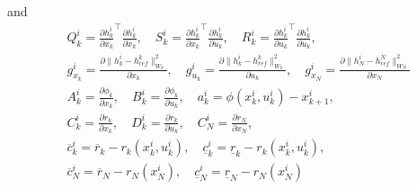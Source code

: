 \documentclass{article}
\newcommand{\norm}[1]{\lVert#1\rVert}
\begin{document}
and
\begin{equation}\label{QP data}
\begin{aligned}
&Q_k^i = \frac{\partial h_k^i}{\partial x_k}^\top \frac{\partial h_k^i}{\partial x_k},\quad S_k^i = \frac{\partial h_k^i}{\partial x_k}^\top \frac{\partial h_k^i}{\partial u_k},\quad R_k^i = \frac{\partial h_k^i}{\partial u_k}^\top \frac{\partial h_k^i}{\partial u_k},\\
&g_{x_k}^i = \frac{\partial \norm{h_k^i-h_{ref}^k}_{W_k}^2}{\partial x_k},\quad g_{u_k}^i = \frac{\partial \norm{h_k^i-h_{ref}^k}_{W_k}^2}{\partial u_k},\quad g_{x_N}^i = \frac{\partial \norm{h_N^i-h_{ref}^N}_{W_N}^2}{\partial x_N}\\
&A_k^i=\frac{\partial \phi_k}{\partial x_k}, \quad B_k^i=\frac{\partial \phi_k}{\partial u_k},\quad a_k^i = \phi(x_k^i,u_k^i)-x_{k+1}^i,\\
&C_k^i=\frac{\partial r_k}{\partial x_k}, \quad D_k^i=\frac{\partial r_k}{\partial u_k},\quad C_N^i=\frac{\partial r_N}{\partial x_N},\\
&\overline{c}_k^i=\overline{r}_k-r_k(x_k^i,u_k^i),\quad  \underline{c}_k^i=\underline{r}_k-r_k(x_k^i,u_k^i),\\
&\overline{c}_N^i=\overline{r}_N-r_N(x_N^i),\quad  \underline{c}_N^i=\underline{r}_N-r_N(x_N^i)
\end{aligned}
\end{equation}
\end{document}

